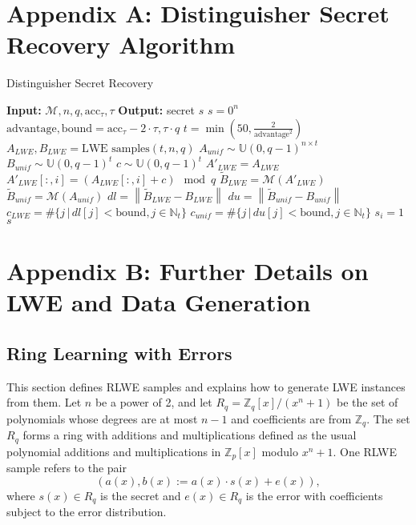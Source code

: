 \documentclass{article}
\begin{document}
\newpage

\section*{Appendix A: Distinguisher Secret Recovery Algorithm}

\begin{algorithm}
    \caption{Distinguisher Secret Recovery}
    \begin{algorithmic}[1]
        \State \textbf{Input:} \( \mathcal{M}, n, q, \text{acc}_{\tau}, \tau \)
        \State \textbf{Output:} secret \( s \)
        \State \( s = 0^n \)
        \State \( \text{advantage}, \text{bound} = \text{acc}_{\tau} - 2 \cdot \tau, \tau \cdot q \)
        \State \( t = \min \left( 50, \frac{2}{\text{advantage}^2} \right) \)
        \State \( A_{LWE}, B_{LWE} = \text{LWE samples}(t, n, q) \)
            \State \( A_{unif} \sim \mathbb{U}(0, q-1)^{n \times t} \)
            \State \( B_{unif} \sim \mathbb{U}(0, q-1)^t \)
            \State \( c \sim \mathbb{U}(0, q-1)^t \)
            \State \( A'_{LWE} = A_{LWE} \)
            \State \( A'_{LWE}[:,i] = (A_{LWE}[:,i] + c) \mod q \)
            \State \( \tilde{B}_{LWE} = \mathcal{M}(A'_{LWE}) \)
            \State \( \tilde{B}_{unif} = \mathcal{M}(A_{unif}) \)
            \State \( dl = \left\| \tilde{B}_{LWE} - B_{LWE} \right\| \)
            \State \( du = \left\| \tilde{B}_{unif} - B_{unif} \right\| \)
            \State \( c_{LWE} = \# \{ j \, | \, dl[j] < \text{bound}, j \in \mathbb{N}_t \} \)
            \State \( c_{unif} = \# \{ j \, | \, du[j] < \text{bound}, j \in \mathbb{N}_t \} \)
                \State \( s_i = 1 \)
            \EndIf
        \EndFor
        \State \Return \( s \)
    \end{algorithmic}
    \end{algorithm}

    \newpage

    \section*{Appendix B: Further Details on LWE and Data Generation}
    \subsection*{Ring Learning with Errors}
    
    This section defines RLWE samples and explains how to generate LWE instances from them. Let \( n \) be a power of 2, and let \( R_q = \mathbb{Z}_q[x]/(x^n + 1) \) be the set of polynomials whose degrees are at most \( n-1 \) and coefficients are from \( \mathbb{Z}_q \). The set \( R_q \) forms a ring with additions and multiplications defined as the usual polynomial additions and multiplications in \( \mathbb{Z}_p[x] \) modulo \( x^n + 1 \). One RLWE sample refers to the pair 
    \[
    (a(x), b(x) := a(x) \cdot s(x) + e(x)),
    \]
    where \( s(x) \in R_q \) is the secret and \( e(x) \in R_q \) is the error with coefficients subject to the error distribution.
    
\end{document}
